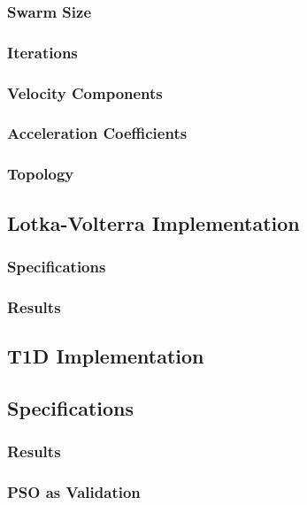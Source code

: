 \subsubsection{Swarm Size}
\subsubsection{Iterations}
\subsubsection{Velocity Components}
\subsubsection{Acceleration Coefficients}
\subsubsection{Topology}


\subsection{Lotka-Volterra Implementation} \label{PSO_LV}
\subsubsection{Specifications}
\subsubsection{Results}

\subsection{T1D Implementation} \label{PSO_T1D}
\subsection{Specifications}
\subsubsection{Results}
\subsubsection{PSO as Validation}

